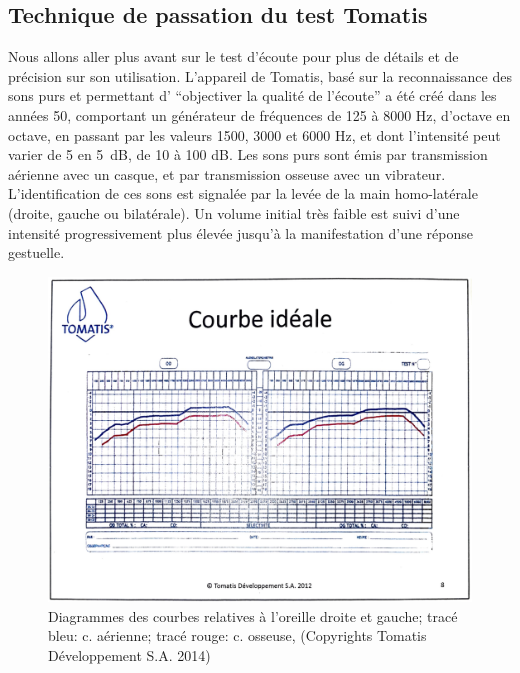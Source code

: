 \subsection{Technique de passation du test Tomatis}
Nous allons aller plus avant sur le test d'écoute pour plus de détails et de précision sur son utilisation.
L'appareil de Tomatis, basé sur la reconnaissance des sons purs 
et permettant d'
\enquote{objectiver la qualité de l'écoute} \autocite [34--35]{Tomatislangage}
 a été créé dans les années 50, comportant un générateur de fréquences
  de 125 à 8000 Hz, d'octave en octave, en passant par les valeurs
1500, 3000 et 6000 Hz, et dont l'intensité peut varier de 5 en \SI{5}{\dB}, de 10 à 100 dB.
Les sons purs sont émis par 
  transmission aérienne avec un casque, et par transmission osseuse
  avec un vibrateur.
L'identification de ces sons est
  signalée par la levée de la main homo-latérale (droite, gauche ou
  bilatérale).
Un volume initial très faible est suivi d'une intensité
progressivement plus élevée jusqu'à la manifestation d'une réponse gestuelle.



\begin{figure}
	\centering
	\includegraphics[width=1\linewidth]{images/graphiques/courbeideale.png}
	\caption[Courbe idéale]{Diagrammes des courbes relatives à l'oreille droite et
          gauche; tracé bleu: c. aérienne; tracé rouge: c.
          osseuse, (Copyrights Tomatis Développement S.A.  2014) }
	\label{Courbe idéale}
\end{figure}




